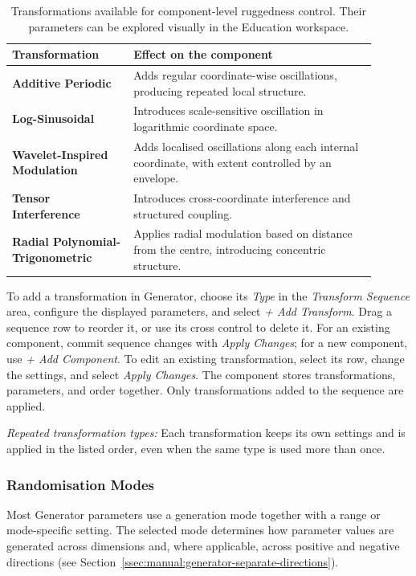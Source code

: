 \documentclass[journal,onecolumn]{IEEEtran}
\begin{document}
\begin{table}[H]
\centering
\small
\caption{Transformations available for component-level ruggedness control. Their parameters can be explored visually in the Education workspace.}
\label{tab:manual:transformation-operators}
\begin{tabular}{@{}p{0.30\linewidth}p{0.60\linewidth}@{}}
\toprule
\textbf{Transformation} & \textbf{Effect on the component} \\
\midrule
\textbf{Additive Periodic} & Adds regular coordinate-wise oscillations, producing repeated local structure. \\
\textbf{Log-Sinusoidal} & Introduces scale-sensitive oscillation in logarithmic coordinate space. \\
\textbf{Wavelet-Inspired Modulation} & Adds localised oscillations along each internal coordinate, with extent controlled by an envelope. \\
\textbf{Tensor Interference} & Introduces cross-coordinate interference and structured coupling. \\
\textbf{Radial Polynomial-Trigonometric} & Applies radial modulation based on distance from the centre, introducing concentric structure. \\
\bottomrule
\end{tabular}
\end{table}

To add a transformation in Generator, choose its \emph{Type} in the \emph{Transform Sequence} area, configure the displayed parameters, and select \emph{+ Add Transform}. Drag a sequence row to reorder it, or use its cross control to delete it. For an existing component, commit sequence changes with \emph{Apply Changes}; for a new component, use \emph{+ Add Component}. To edit an existing transformation, select its row, change the settings, and select \emph{Apply Changes}. The component stores transformations, parameters, and order together. Only transformations added to the sequence are applied.

\emph{Repeated transformation types:} Each transformation keeps its own settings and is applied in the listed order, even when the same type is used more than once.

\subsubsection{Randomisation Modes}
\label{ssec:manual:generator-randomisation}

Most Generator parameters use a generation mode together with a range or mode-specific setting. The selected mode determines how parameter values are generated across dimensions and, where applicable, across positive and negative directions (see Section~\ref{ssec:manual:generator-separate-directions}).
\end{document}
